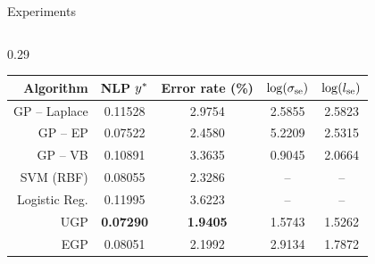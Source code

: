 \documentclass[final]{beamer}
\newlength{\onecolwid}
\newlength{\twocolwid}
\begin{document}
\begin{frame}[t]
\begin{columns}[t]
\begin{column}{\twocolwid}
\begin{columns}[t,totalwidth=\twocolwid]
\begin{column}{\twocolwid}
\begin{block}{Experiments}
\begin{columns}
\begin{column}{0.29\twocolwid}
\begin{table}[tb]
    \vspace{5mm}
    \scriptsize
    \begin{tabular}{r| c c c c}
    Algorithm & NLP $y^{*}$ & Error rate (\%) 
        & $\log\!\left({\sigma_\text{se}}\right)$ & $\log\!\left({l_\text{se}}\right)$ \\
    \toprule
    GP -- Laplace & 0.11528 & 2.9754 & 2.5855 & 2.5823 \\
    GP -- EP & 0.07522 & 2.4580 & 5.2209 & 2.5315 \\
    GP -- VB & 0.10891 & 3.3635 & 0.9045 & 2.0664 \\ 
    SVM (RBF) & 0.08055 & 2.3286 & -- & -- \\
    Logistic Reg. & 0.11995 & 3.6223 & -- & -- \\
    \midrule
    UGP & \textbf{0.07290} & \textbf{1.9405} & 1.5743 & 1.5262 \\
    EGP & 0.08051 & 2.1992 & 2.9134 & 1.7872 \\
    \bottomrule
    \end{tabular}
    \label{tab:class}
\end{table}

\vfill

\end{column}
\end{columns}
\end{block}


\end{column} %









\end{columns} %

\end{column} %


\end{columns}
\end{frame}
\end{document}
